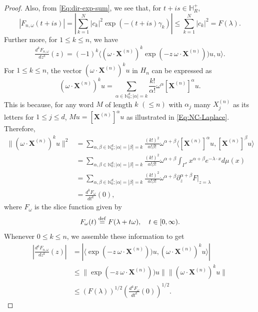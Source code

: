 \documentclass[11pt,reqno]{amsart}
\theoremstyle{plain}
\theoremstyle{definition}
\numberwithin{equation}{section}
\newcommand{\bydef}{\stackrel{\rm def}{=}}
\begin{document}
\begin{proof}
    Also, from \eqref{Eq:dir-exp-sum}, we see that, for $t+is \in \mathbb{H}^+_R$,
    $$
    |F_{n, \omega}(t +is)| =\left| \sum_{k=1}^N |c_k|^2 \exp{(-(t+is) \gamma_k )} \right| \leq \sum_{k=1}^N |c_k|^2 = F(\lambda).
    $$
    Further more, for $1\leq k \leq n$, we have
    \begin{align*}
        \frac{d^k F_{n, \omega}}{dz^k}(z) = (-1)^k \langle (\omega \cdot \boldsymbol{X}^{(n)})^k \exp(-z \ \omega \cdot \boldsymbol{X}^{(n)})) u, u \rangle.
    \end{align*}
For $1\leq k \le n$, the vector $(\omega \cdot \boldsymbol{X}^{(n)})^k u$ in $H_n$ can be expressed as 
$$
(\omega \cdot \boldsymbol{X}^{(n)})^k u = \sum_{\alpha \in \mathbb{N}_0^d; |\alpha|=k} \frac{k!}{\alpha!}\omega^\alpha [\boldsymbol{X}^{(n)}]^\alpha u.
$$
This is because, for any word $M$ of length $k$ $(\leq n)$ with $\alpha_j$ many $X^{(n)}_j$ as its letters for $1\leq j \leq d$, $M u = [\boldsymbol{X}^{(n)}]^\alpha u$ as illustrated in \eqref{Eq:NC-Laplace}. Therefore,
\begin{align*}
 \| (\omega \cdot \boldsymbol{X}^{(n)})^k u  \|^2 &= \sum_{\alpha, \beta \in \mathbb{N}_0^d; |\alpha|=|\beta|=k} \frac{(k!)^2}{\alpha! \beta!} \omega^{\alpha + \beta}\langle [\boldsymbol{X}^{(n)}]^\alpha u,  [\boldsymbol{X}^{(n)}]^\beta u\rangle \\
 &= \sum_{\alpha, \beta \in \mathbb{N}_0^d; |\alpha|=|\beta|=k} \frac{(k!)^2}{\alpha! \beta!} \omega^{\alpha + \beta} \int_{\Gamma^*} x^{\alpha + \beta} e^{-\lambda \cdot x} d\mu(x)\\
 &= \sum_{\alpha, \beta \in \mathbb{N}_0^d; |\alpha|=|\beta|=k} \frac{(k!)^2}{\alpha! \beta!} \omega^{\alpha + \beta} \partial^{\alpha + \beta}_z F|_{z=\lambda}\\
 &=\frac{d^k F_\omega}{dt^k}(0),
\end{align*}
    where $F_\omega$ is the slice function given by 
    $$
    F_\omega(t) \bydef F(\lambda + t \omega), \quad t\in [0, \infty).
    $$
    Whenever $0\leq k \leq n$, we assemble these information to get
    \begin{align*}
        \left| \frac{d^k F_{n, \omega}}{dz^k}(z) \right| &= \left| \langle  \exp(-z \ \omega \cdot \boldsymbol{X}^{(n)})) u, (\omega \cdot \boldsymbol{X}^{(n)})^k u \rangle \right| \\
        & \leq \|\exp(-z \ \omega \cdot \boldsymbol{X}^{(n)})) u\| \| (\omega \cdot \boldsymbol{X}^{(n)})^k u\| \\
        & \leq (F(\lambda))^{1/2} \left(\frac{d^k F_\omega}{d t^k}(0)\right)^{1/2}.
    \end{align*}



\end{proof}
\end{document}
